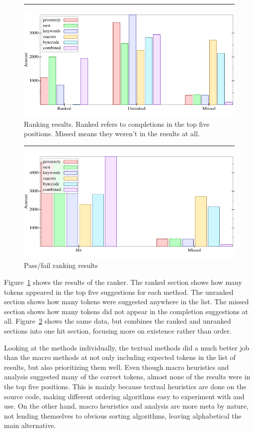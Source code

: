 \documentclass[ms,electronic,twosidetoc,letterpaper,chaptercenter,parttop,lol,lof,lot]{byumsphd}
\begin{document}
\begin{figure}[h]
\centering
\hrule
\includegraphics[width=1.0\textwidth]{../output/synthesis/ranker/Remove-combined.png}
\caption{Ranking results. Ranked refers to completions in the top five positions. Missed means they weren't in the results at all.}
\label{fig:ranker-combined}
\end{figure}

\begin{figure}[h]
\centering
\hrule
\includegraphics[width=1.0\textwidth]{../output/synthesis/ranker/Remove-uber-combined.png}
\caption{Pass/fail ranking results}
\label{fig:ranker-uber-combined}
\end{figure}

Figure~\ref{fig:ranker-combined} shows the results of the ranker.
The ranked section shows how many tokens appeared in the top five suggestions for each method.
The unranked section shows how many tokens were suggested anywhere in the list.
The missed section shows how many tokens did not appear in the completion suggestions at all.
Figure~\ref{fig:ranker-uber-combined} shows the same data, but combines the ranked and unranked sections into one hit section, focusing more on existence rather than order.

Looking at the methods individually, the textual methods did a much better job than the macro methods at not only including expected tokens in the list of results, but also prioritizing them well.
Even though macro heuristics and analysis suggested many of the correct tokens, almost none of the results were in the top five positions.
This is mainly because textual heuristics are done on the source code, making different ordering algorithms easy to experiment with and use.
On the other hand, macro heuristics and analysis are more meta by nature, not lending themselves to obvious sorting algorithms, leaving alphabetical the main alternative.
\end{document}

